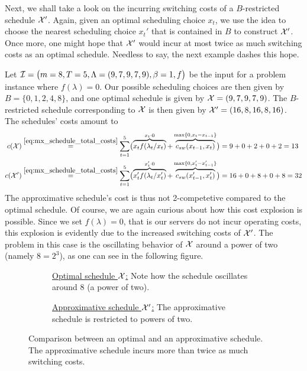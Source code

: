 Next, we shall take a look on the incurring switching costs of a $B$-restricted schedule $\mathcal{X}'$. Again, given an optimal scheduling choice $x_t$, we use the idea to choose the nearest scheduling choice $x_t'$ that is contained in $B$ to construct $\mathcal{X}'$. Once more, one might hope that $\mathcal{X}'$ would incur at most twice as much switching costs as an optimal schedule. Needless to say, the next example dashes this hope.
\begin{exmpl}
Let $\mathcal{I}=\bigl(m=8,T=5,\Lambda=(9,7,9,7,9),\beta=1,f\bigr)$ be the input for a problem instance where $f(\lambda)=0$. Our possible scheduling choices are then given by $B=\{0,1,2,4,8\}$, and one optimal schedule is given by $\mathcal{X}=(9,7,9,7,9)$. The $B$-restricted schedule corresponding to $\mathcal{X}$ is then given by $\mathcal{X}'=(16,8,16,8,16)$. The schedules' costs amount to
\begin{align*}
	c(\mathcal{X})&\stackrel{\eqref{eq:mx_schedule_total_costs}}{=}\sum\limits_{t=1}^{5}\bigl(\overbrace{x_tf(\lambda_t/x_t)}^{x_t\cdot 0}+\overbrace{c_{sw}(x_{t-1},x_t)}^{\max\{0,x_t-x_{t-1}\}}\bigr)=9+0+2+0+2=13\\
	c(\mathcal{X}')&\stackrel{\eqref{eq:mx_schedule_total_costs}}{=}\sum\limits_{t=1}^{5}\bigl(\overbrace{x_t'f(\lambda_t/x_t')}^{x_t'\cdot 0}+\overbrace{c_{sw}(x_{t-1}',x_t')}^{\max\{0,x_t'-x_{t-1}'\}}\bigr)=16+0+8+0+8=32
\end{align*}
The approximative schedule's cost is thus not 2-competetive compared to the optimal schedule. Of course, we are again curious about how this cost explosion is possible. Since we set $f(\lambda)=0$, that is our servers do not incur operating costs, this explosion is evidently due to the increased switching costs of $\mathcal{X}'$. The problem in this case is the oscillating behavior of $\mathcal{X}$ around a power of two (namely $8=2^3$), as one can see in the following figure. 
\begin{figure}[H]
\captionsetup[subfigure]{labelformat=empty}
\begin{subfigure}[b]{0.5\textwidth}

	\caption{\underline{Optimal schedule $\mathcal{X}$:} Note how the schedule oscillates around 8 (a power of two).}
\end{subfigure}
\hfill
\begin{subfigure}[b]{0.5\textwidth}

	\caption{\underline{Approximative schedule $\mathcal{X}'$:} The approximative schedule is restricted to powers of two.}
\end{subfigure}
\caption{Comparison between an optimal and an approximative schedule. The approximative schedule incurs more than twice as much switching costs.}
\label{fig:adaption-schedule}
\end{figure}
\end{exmpl}
